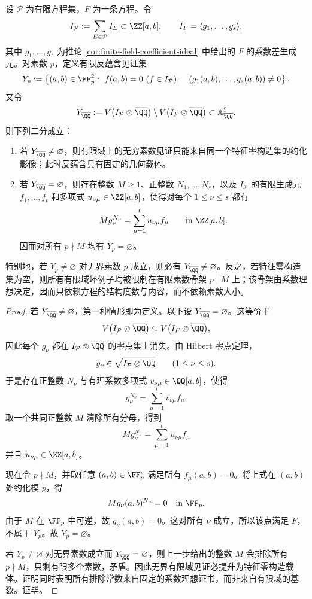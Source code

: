 \begin{theorem}\label{distill:breuillard_green_tao_approximate_groups_and_helfgott_growth-uniform_finite_to_geometric_transfer-finite-field-anti-implication-geometric-transfer}
设 \(\mathcal P\) 为有限方程集，\(F\) 为一条方程。令
\[
I_{\mathcal P}:=\sum_{E\in\mathcal P}I_E\subset \ZZ[a,b],
\qquad
I_F=\langle g_1,\ldots,g_s\rangle,
\]
其中 \(g_1,\ldots,g_s\) 为推论 \ref{cor:finite-field-coefficient-ideal} 中给出的 \(F\) 的系数差生成元。对素数 \(p\)，定义有限反蕴含见证集
\[
Y_p:=\left\{(a,b)\in\FF_p^2:\ f(a,b)=0\ (f\in I_{\mathcal P}),\quad
(g_1(a,b),\ldots,g_s(a,b))\neq 0\right\}.
\]
又令
\[
Y_{\overline{\QQ}}:=V\bigl(I_{\mathcal P}\otimes\overline{\QQ}\bigr)
\setminus V\bigl(I_F\otimes\overline{\QQ}\bigr)
\subset \mathbb A^2_{\overline{\QQ}}.
\]
则下列二分成立：
\begin{enumerate}
  \item 若 \(Y_{\overline{\QQ}}\neq\varnothing\)，则有限域上的无穷素数见证只能来自同一个特征零构造集的约化影像；此时反蕴含具有固定的几何载体。
  \item 若 \(Y_{\overline{\QQ}}=\varnothing\)，则存在整数 \(M\geq 1\)、正整数 \(N_1,\ldots,N_s\)，以及 \(I_{\mathcal P}\) 的有限生成元 \(f_1,\ldots,f_t\) 和多项式 \(u_{\nu\mu}\in\ZZ[a,b]\)，使得对每个 \(1\leq \nu\leq s\) 都有
  \[
  M g_\nu^{N_\nu}=\sum_{\mu=1}^t u_{\nu\mu}f_\mu
  \qquad\text{in }\ZZ[a,b].
  \]
  因而对所有 \(p\nmid M\) 均有 \(Y_p=\varnothing\)。
\end{enumerate}
特别地，若 \(Y_p\neq\varnothing\) 对无界素数 \(p\) 成立，则必有 \(Y_{\overline{\QQ}}\neq\varnothing\)。反之，若特征零构造集为空，则所有有限域坏例子均被限制在有限素数骨架 \(p\mid M\) 上；该骨架由系数理想决定，因而只依赖方程的结构度数与内容，而不依赖素数大小。
\end{theorem}
\begin{proof}
若 \(Y_{\overline{\QQ}}\neq\varnothing\)，第一种情形即为定义。以下设 \(Y_{\overline{\QQ}}=\varnothing\)。这等价于
\[
V\bigl(I_{\mathcal P}\otimes\overline{\QQ}\bigr)\subseteq
V\bigl(I_F\otimes\overline{\QQ}\bigr),
\]
因此每个 \(g_\nu\) 都在 \(I_{\mathcal P}\otimes\overline{\QQ}\) 的零点集上消失。由 Hilbert 零点定理，
\[
g_\nu\in \sqrt{I_{\mathcal P}\otimes\QQ}
\qquad(1\leq \nu\leq s).
\]
于是存在正整数 \(N_\nu\) 与有理系数多项式 \(v_{\nu\mu}\in\QQ[a,b]\)，使得
\[
g_\nu^{N_\nu}=\sum_{\mu=1}^t v_{\nu\mu}f_\mu.
\]
取一个共同正整数 \(M\) 清除所有分母，得到
\[
M g_\nu^{N_\nu}=\sum_{\mu=1}^t u_{\nu\mu}f_\mu
\]
并且 \(u_{\nu\mu}\in\ZZ[a,b]\)。

现在令 \(p\nmid M\)，并取任意 \((a,b)\in\FF_p^2\) 满足所有 \(f_\mu(a,b)=0\)。将上式在 \((a,b)\) 处约化模 \(p\)，得
\[
M g_\nu(a,b)^{N_\nu}=0\quad\text{in }\FF_p.
\]
由于 \(M\) 在 \(\FF_p\) 中可逆，故 \(g_\nu(a,b)=0\)。这对所有 \(\nu\) 成立，所以该点满足 \(F\)，不属于 \(Y_p\)。故 \(Y_p=\varnothing\)。

若 \(Y_p\neq\varnothing\) 对无界素数成立而 \(Y_{\overline{\QQ}}=\varnothing\)，则上一步给出的整数 \(M\) 会排除所有 \(p\nmid M\)，只剩有限多个素数，矛盾。因此无界有限域见证必提升为特征零构造载体。证明同时表明所有排除常数来自固定的系数理想证书，而非来自有限域的基数。证毕。
\end{proof}

